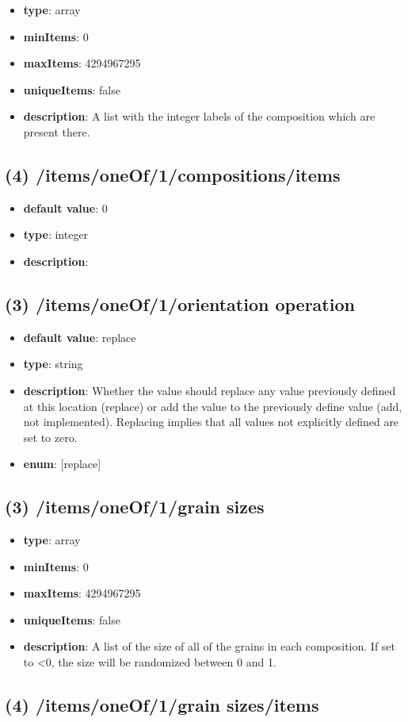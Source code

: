 \begin{itemize}[leftmargin=3em]\item {\bf type}: array
\item {\bf minItems}: 0
\item {\bf maxItems}: 4294967295
\item {\bf uniqueItems}: false
\item {\bf description}: A list with the integer labels of the composition which are present there.
\end{itemize}\subsection{(4) /items/oneOf/1/compositions/items}
\begin{itemize}[leftmargin=4em]\item {\bf default value}: 0
\item {\bf type}: integer
\item {\bf description}: 
\end{itemize}\subsection{(3) /items/oneOf/1/orientation operation}
\begin{itemize}[leftmargin=3em]\item {\bf default value}: replace
\item {\bf type}: string
\item {\bf description}: Whether the value should replace any value previously defined at this location (replace) or add the value to the previously define value (add, not implemented). Replacing implies that all values not explicitly defined are set to zero.
\item {\bf enum}: [replace]\end{itemize}\subsection{(3) /items/oneOf/1/grain sizes}
\begin{itemize}[leftmargin=3em]\item {\bf type}: array
\item {\bf minItems}: 0
\item {\bf maxItems}: 4294967295
\item {\bf uniqueItems}: false
\item {\bf description}: A list of the size of all of the grains in each composition. If set to <0, the size will be randomized between 0 and 1.
\end{itemize}\subsection{(4) /items/oneOf/1/grain sizes/items}
